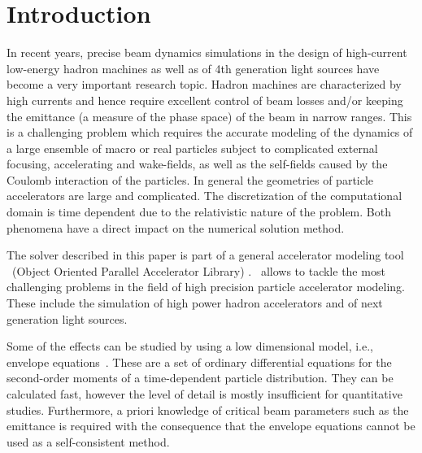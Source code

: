 \section{Introduction}
\label{sec:intro}

In recent years, precise beam dynamics simulations in the design of
high-current low-energy hadron machines as well as of 4th generation
light sources have become a very important research topic.  Hadron
machines are characterized by high currents and hence require excellent
control of beam losses and/or keeping the emittance (a measure of the
phase space) of the beam in narrow ranges. This is a challenging problem
which requires the accurate modeling of the dynamics of a large ensemble
of macro or real particles subject to complicated external focusing,
accelerating and wake-fields, as well as the self-fields caused by the
Coulomb interaction of the particles.  In general the geometries of
particle accelerators are large and complicated. The discretization of
the computational domain is time dependent due to the relativistic
nature of the problem.
Both phenomena have a direct impact on the numerical solution method.
 
The solver described in this paper is part of a general accelerator
modeling tool \opal~(Object Oriented Parallel Accelerator Library)
\cite{opal}.  \opal\ allows to tackle the most challenging problems in
the field of high precision particle accelerator modeling.  These
include the simulation of high power hadron accelerators and of next
generation light sources.

Some of the effects can be studied by using a low dimensional model,
i.e., envelope equations~\cite{sach:68, sach:71, stru-reis:1984,
  gluckstern1}.  These are a set of ordinary differential equations for
the second-order moments of a time-dependent particle distribution.
They can be calculated fast, however the level of detail is mostly 
insufficient for quantitative studies.  Furthermore, a priori knowledge of
critical beam parameters such as the emittance is required with the consequence that the
envelope equations cannot be used as a self-consistent method.

